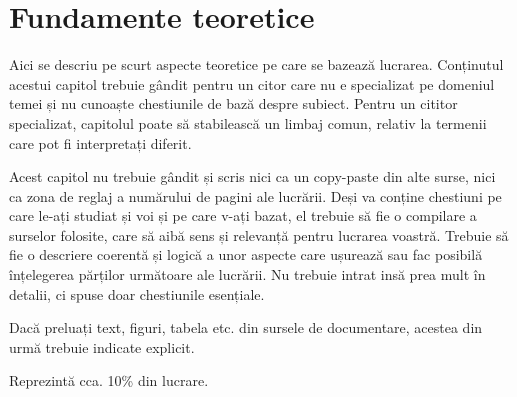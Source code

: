 \chapter{Fundamente teoretice}
\label{cap:fund-teoretice}

Aici se descriu pe scurt aspecte teoretice pe care se bazează lucrarea. Conținutul acestui capitol trebuie gândit pentru un citor care nu e specializat pe domeniul temei și nu cunoaște chestiunile de bază despre subiect. Pentru un cititor specializat, capitolul poate să stabilească un limbaj comun, relativ la termenii care pot fi interpretați diferit. 

Acest capitol nu trebuie gândit și scris nici ca un copy-paste din alte surse, nici ca zona de reglaj a numărului de pagini ale lucrării. Deși va conține chestiuni pe care le-ați studiat și voi și pe care v-ați bazat, el trebuie să fie o compilare a surselor folosite, care să aibă sens și relevanță pentru lucrarea voastră. Trebuie să fie o descriere coerentă și logică a unor aspecte care ușurează sau fac posibilă înțelegerea părților următoare ale lucrării. Nu trebuie intrat insă prea mult în detalii, ci spuse doar chestiunile esențiale. 

Dacă preluați text, figuri, tabela etc. din sursele de documentare, acestea din urmă trebuie indicate explicit. 

Reprezintă cca. 10\% din lucrare.